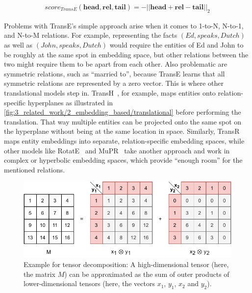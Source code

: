 \begin{align}
    score_{TransE}(\textbf{head}, \textbf{rel}, \textbf{tail}) = {- || \textbf{head} + \textbf{rel} - \textbf{tail} ||}_{2}
    \label{eq:3_related_work/2_embedding_based/trans_e}
\end{align}

Problems with TransE's simple approach arise when it comes to 1-to-N, N-to-1, and N-to-M relations. For example, representing the facts $(Ed, speaks, Dutch)$ as well as $(John, speaks, Dutch)$ would require the entities of Ed and John to be roughly at the same spot in embedding space, but other relations between the two might require them to be apart from each other. Also problematic are symmetric relations, such as ``married to'', because TransE learns that all symmetric relations are represented by a zero vector. This is where other translational models step in. TransH~\cite{Wang2014KnowledgeGE}, for example, maps entities onto relation-specific hyperplanes as illustrated in \autoref{fig:3_related_work/2_embedding_based/translational} before performing the translation. That way multiple entities can be projected onto the same spot on the hyperplane without being at the same location in space. Similarly, TransR~\cite{Lin2015LearningEA} maps entity embeddings into separate, relation-specific embedding spaces, while other models like RotatE~\cite{Sun2019RotatEKG} and MuPR~\cite{Balazevic2019MultirelationalPG} take another approach and work in complex or hyperbolic embedding spaces, which provide ``enough room'' for the mentioned relations.

\begin{figure}[t]
    \centering
    \includegraphics{3_related_work/2_embedding_based/tensor_decomposition}
    \caption{Example for tensor decomposition: A high-dimensional tensor (here, the matrix $M$) can be approximated as the sum of outer products of lower-dimensional tensors (here, the vectors $x_1$, $y_1$, $x_2$ and $y_2$).}
    \label{fig:3_related_work/2_embedding_based/tensor_decomposition}
\end{figure}

